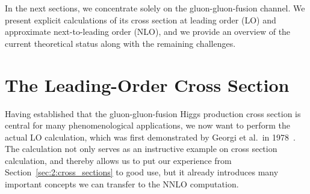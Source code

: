 In the next sections, we concentrate solely on the gluon-gluon-fusion channel.
We present explicit calculations of its cross section at leading order (\acs{LO}) and approximate next-to-leading order (\acs{NLO}), and we provide an overview of the current theoretical status along with the remaining challenges.


\section{The Leading-Order Cross Section} \label{sec:4:LO_xSec}
Having established that the gluon-gluon-fusion Higgs production cross section is central for many phenomenological applications, we now want to perform the actual \acs{LO} calculation, which was first demonstrated by Georgi et al.\ in 1978~\cite{Georgi:1977gs}. The calculation not only serves as an instructive example on cross section calculation, and thereby allows us to put our experience from Section~\ref{sec:2:cross_sections} to good use, but it already introduces many important concepts we can transfer to the \acs{NNLO} computation.

